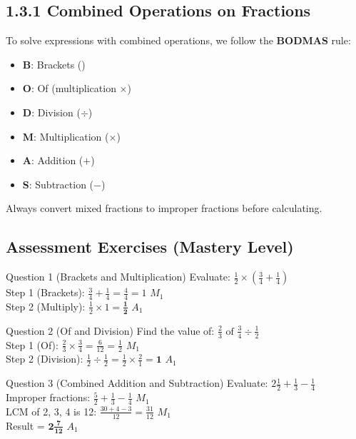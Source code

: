 \documentclass[12pt, a4paper, oneside]{article}
\begin{document}
\subsection*{1.3.1 Combined Operations on Fractions}

\begin{tcolorbox}[colback=lightgrey, colframe=primaryblue, title=\textbf{Concept Summary}, arc=5pt]
    To solve expressions with combined operations, we follow the \textbf{BODMAS} rule:
    \begin{itemize}
        \item \textbf{B}: Brackets ()
        \item \textbf{O}: Of (multiplication $\times$)
        \item \textbf{D}: Division ($\div$)
        \item \textbf{M}: Multiplication ($\times$)
        \item \textbf{A}: Addition ($+$)
        \item \textbf{S}: Subtraction ($-$)
    \end{itemize}
    Always convert mixed fractions to improper fractions before calculating.
\end{tcolorbox}

\subsection*{Assessment Exercises (Mastery Level)}

\begin{solvingbox}{Question 1 (Brackets and Multiplication)}
Evaluate: $\frac{1}{2} \times (\frac{3}{4} + \frac{1}{4})$ \\
Step 1 (Brackets): $\frac{3}{4} + \frac{1}{4} = \frac{4}{4} = 1$ \hfill $M_1$ \\
Step 2 (Multiply): $\frac{1}{2} \times 1 = \mathbf{\frac{1}{2}}$ \hfill $A_1$
\end{solvingbox}

\begin{solvingbox}{Question 2 (Of and Division)}
Find the value of: $\frac{2}{3} \text{ of } \frac{3}{4} \div \frac{1}{2}$ \\
Step 1 (Of): $\frac{2}{3} \times \frac{3}{4} = \frac{6}{12} = \frac{1}{2}$ \hfill $M_1$ \\
Step 2 (Division): $\frac{1}{2} \div \frac{1}{2} = \frac{1}{2} \times \frac{2}{1} = \mathbf{1}$ \hfill $A_1$
\end{solvingbox}

\begin{solvingbox}{Question 3 (Combined Addition and Subtraction)}
Evaluate: $2\frac{1}{2} + \frac{1}{3} - \frac{1}{4}$ \\
Improper fractions: $\frac{5}{2} + \frac{1}{3} - \frac{1}{4}$ \hfill $M_1$ \\
LCM of 2, 3, 4 is 12: $\frac{30 + 4 - 3}{12} = \frac{31}{12}$ \hfill $M_1$ \\
Result = $\mathbf{2\frac{7}{12}}$ \hfill $A_1$
\end{solvingbox}
\end{document}
